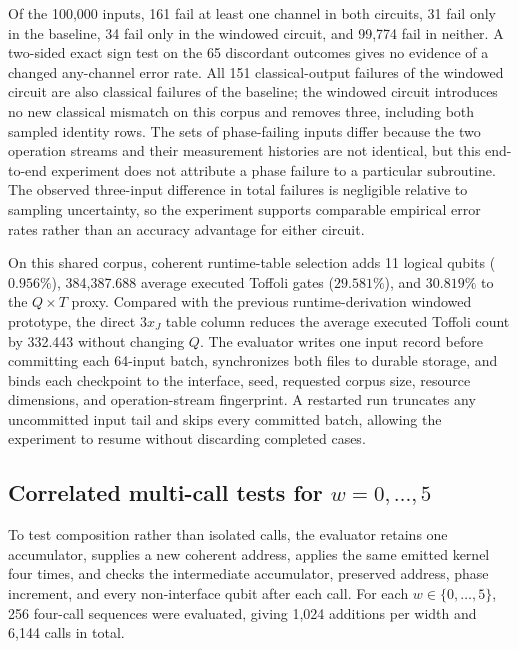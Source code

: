 \documentclass[10pt]{article}
\begin{document}
Of the 100,000 inputs, 161 fail at least one channel in both circuits, 31 fail only in the baseline, 34 fail only in the windowed circuit, and 99,774 fail in neither. A two-sided exact sign test on the 65 discordant outcomes gives no evidence of a changed any-channel error rate. All 151 classical-output failures of the windowed circuit are also classical failures of the baseline; the windowed circuit introduces no new classical mismatch on this corpus and removes three, including both sampled identity rows. The sets of phase-failing inputs differ because the two operation streams and their measurement histories are not identical, but this end-to-end experiment does not attribute a phase failure to a particular subroutine. The observed three-input difference in total failures is negligible relative to sampling uncertainty, so the experiment supports comparable empirical error rates rather than an accuracy advantage for either circuit.

On this shared corpus, coherent runtime-table selection adds 11 logical qubits ($0.956\%$), 384,387.688 average executed Toffoli gates ($29.581\%$), and $30.819\%$ to the $Q\times T$ proxy. Compared with the previous runtime-derivation windowed prototype, the direct $3x_J$ table column reduces the average executed Toffoli count by 332.443 without changing $Q$. The evaluator writes one input record before committing each 64-input batch, synchronizes both files to durable storage, and binds each checkpoint to the interface, seed, requested corpus size, resource dimensions, and operation-stream fingerprint. A restarted run truncates any uncommitted input tail and skips every committed batch, allowing the experiment to resume without discarding completed cases.

\subsection{Correlated multi-call tests for \texorpdfstring{$w=0,\ldots,5$}{w=0,...,5}}

To test composition rather than isolated calls, the evaluator retains one accumulator, supplies a new coherent address, applies the same emitted kernel four times, and checks the intermediate accumulator, preserved address, phase increment, and every non-interface qubit after each call. For each $w\in\{0,\ldots,5\}$, 256 four-call sequences were evaluated, giving 1,024 additions per width and 6,144 calls in total.
\end{document}
